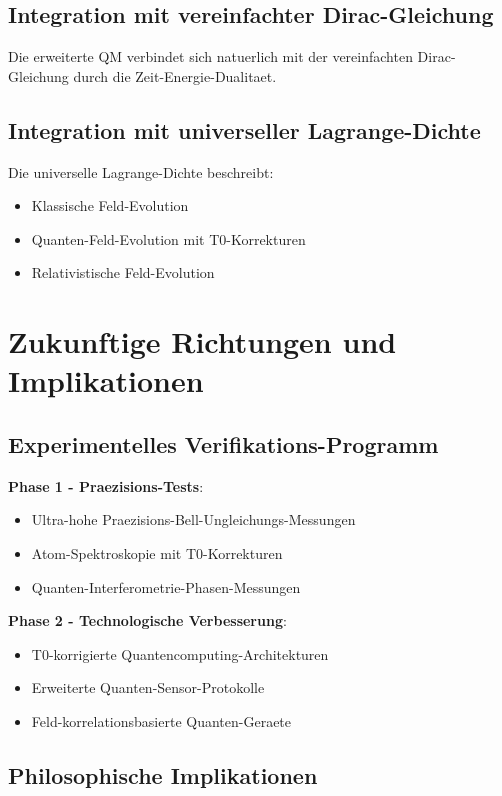 \documentclass[12pt,a4paper]{article}
\begin{document}
	\subsection{Integration mit vereinfachter Dirac-Gleichung}
	
	Die erweiterte QM verbindet sich natuerlich mit der vereinfachten Dirac-Gleichung durch die Zeit-Energie-Dualitaet.
	
	\subsection{Integration mit universeller Lagrange-Dichte}
	
	Die universelle Lagrange-Dichte beschreibt:
	\begin{itemize}
		\item Klassische Feld-Evolution
		\item Quanten-Feld-Evolution mit T0-Korrekturen
		\item Relativistische Feld-Evolution
	\end{itemize}
	
	\section{Zukunftige Richtungen und Implikationen}
	
	\subsection{Experimentelles Verifikations-Programm}
	
	\textbf{Phase 1 - Praezisions-Tests}:
	\begin{itemize}
		\item Ultra-hohe Praezisions-Bell-Ungleichungs-Messungen
		\item Atom-Spektroskopie mit T0-Korrekturen
		\item Quanten-Interferometrie-Phasen-Messungen
	\end{itemize}
	
	\textbf{Phase 2 - Technologische Verbesserung}:
	\begin{itemize}
		\item T0-korrigierte Quantencomputing-Architekturen
		\item Erweiterte Quanten-Sensor-Protokolle
		\item Feld-korrelationsbasierte Quanten-Geraete
	\end{itemize}
	
	\subsection{Philosophische Implikationen}
	
\end{document}
